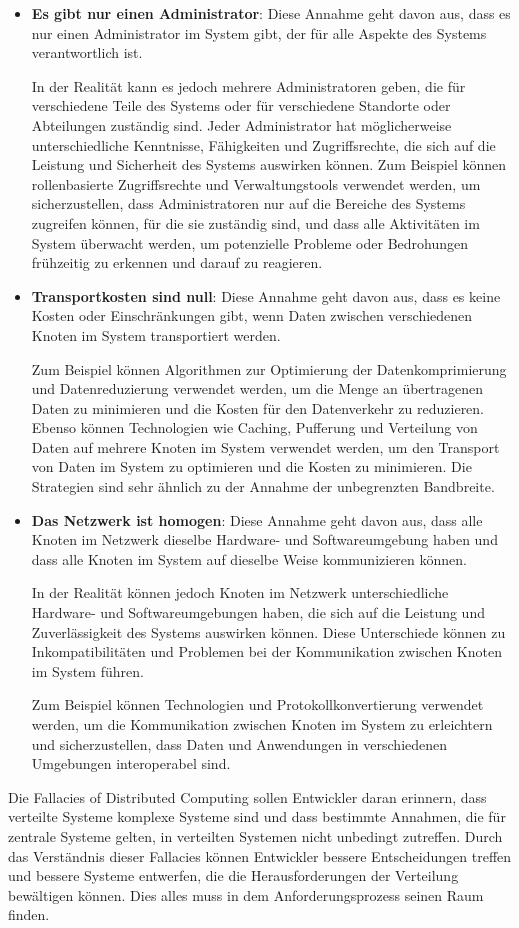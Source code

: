 \begin{itemize}
\item \textbf{Es gibt nur einen Administrator}: Diese Annahme geht davon aus, dass es nur einen Administrator im System gibt, der für alle Aspekte des Systems verantwortlich ist.

In der Realität kann es jedoch mehrere Administratoren geben, die für verschiedene Teile des Systems oder für verschiedene Standorte oder Abteilungen zuständig sind. Jeder Administrator hat möglicherweise unterschiedliche Kenntnisse, Fähigkeiten und Zugriffsrechte, die sich auf die Leistung und Sicherheit des Systems auswirken können.
Zum Beispiel können rollenbasierte Zugriffsrechte und Verwaltungstools verwendet werden, um sicherzustellen, dass Administratoren nur auf die Bereiche des Systems zugreifen können, für die sie zuständig sind, und dass alle Aktivitäten im System überwacht werden, um potenzielle Probleme oder Bedrohungen frühzeitig zu erkennen und darauf zu reagieren.

\item \textbf{Transportkosten sind null}:
Diese Annahme geht davon aus, dass es keine Kosten oder Einschränkungen gibt, wenn Daten zwischen verschiedenen Knoten im System transportiert werden. 

Zum Beispiel können Algorithmen zur Optimierung der Datenkomprimierung und Datenreduzierung verwendet werden, um die Menge an übertragenen Daten zu minimieren und die Kosten für den Datenverkehr zu reduzieren. Ebenso können Technologien wie Caching, Pufferung und Verteilung von Daten auf mehrere Knoten im System verwendet werden, um den Transport von Daten im System zu optimieren und die Kosten zu minimieren. Die Strategien sind sehr ähnlich zu der Annahme der unbegrenzten Bandbreite. 
\item \textbf{Das Netzwerk ist homogen}: Diese Annahme geht davon aus, dass alle Knoten im Netzwerk dieselbe Hardware- und Softwareumgebung haben und dass alle Knoten im System auf dieselbe Weise kommunizieren können.

In der Realität können jedoch Knoten im Netzwerk unterschiedliche Hardware- und Softwareumgebungen haben, die sich auf die Leistung und Zuverlässigkeit des Systems auswirken können. Diese Unterschiede können zu Inkompatibilitäten und Problemen bei der Kommunikation zwischen Knoten im System führen.

Zum Beispiel können Technologien und Protokollkonvertierung verwendet werden, um die Kommunikation zwischen Knoten im System zu erleichtern und sicherzustellen, dass Daten und Anwendungen in verschiedenen Umgebungen interoperabel sind.
\end{itemize}  
Die Fallacies of Distributed Computing sollen Entwickler daran erinnern, dass verteilte Systeme komplexe Systeme sind und dass bestimmte Annahmen, die für zentrale Systeme gelten, in verteilten Systemen nicht unbedingt zutreffen. Durch das Verständnis dieser Fallacies können Entwickler bessere Entscheidungen treffen und bessere Systeme entwerfen, die die Herausforderungen der Verteilung bewältigen können. Dies alles muss in dem Anforderungsprozess seinen Raum finden.